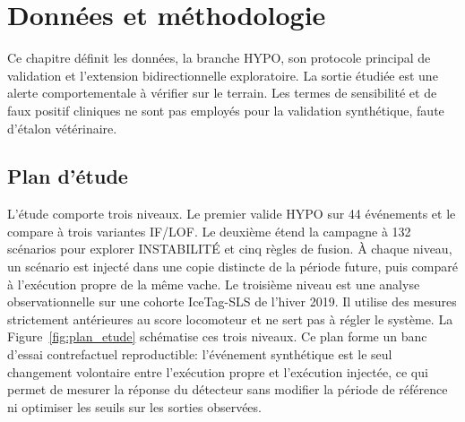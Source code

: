 \chapter{Données et méthodologie}
\label{chapitre:methodologie}

Ce chapitre définit les données, la branche HYPO, son protocole principal de validation et
l'extension bidirectionnelle exploratoire. La sortie étudiée est une alerte comportementale
à vérifier sur le terrain. Les termes de sensibilité et de faux positif cliniques ne sont
pas employés pour la validation synthétique, faute d'étalon vétérinaire.

\section{Plan d'étude}

L'étude comporte trois niveaux. Le premier valide HYPO sur 44 événements et le compare à
trois variantes IF/LOF. Le deuxième étend la campagne à 132 scénarios pour explorer
INSTABILITÉ et cinq règles de fusion. À chaque niveau, un scénario est injecté dans une
copie distincte de la période future, puis comparé à l'exécution propre de la même
vache. Le troisième niveau est une analyse observationnelle sur une cohorte IceTag-SLS de
l'hiver 2019. Il utilise des mesures strictement antérieures au score locomoteur et ne sert
pas à régler le système. La Figure~\ref{fig:plan_etude} schématise ces trois niveaux.
Ce plan forme un banc d'essai contrefactuel reproductible: l'événement synthétique est le
seul changement volontaire entre l'exécution propre et l'exécution injectée, ce qui permet de
mesurer la réponse du détecteur sans modifier la période de référence ni optimiser les seuils
sur les sorties observées.

